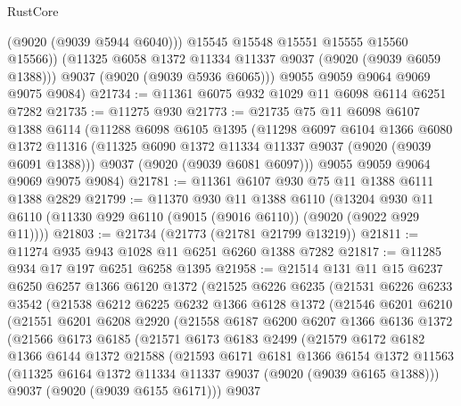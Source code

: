 \begin{lexlean}{RustCore}
\begin{coremodule}
              (@9020 (@9039 @5944 @6040)))
            @15545
            @15548
            @15551
            @15555
            @15560
            @15566))
        (@11325 @6058 @1372 @11334 @11337 @9037 (@9020 (@9039 @6059 @1388)))
        @9037
        (@9020 (@9039 @5936 @6065)))
      @9055
      @9059
      @9064
      @9069
      @9075
      @9084)
@21734 := @11361 @6075 @932 @1029 @11 @6098 @6114 @6251 @7282
@21735 := @11275 @930
@21773 := @21735
    @75
    @11
    @6098
    @6107
    @1388
    @6114
    (@11288
      @6098
      @6105
      @1395
      (@11298
        @6097
        @6104
        @1366
        @6080
        @1372
        @11316
        (@11325 @6090 @1372 @11334 @11337 @9037 (@9020 (@9039 @6091 @1388)))
        @9037
        (@9020 (@9039 @6081 @6097)))
      @9055
      @9059
      @9064
      @9069
      @9075
      @9084)
@21781 := @11361 @6107 @930 @75 @11 @1388 @6111 @1388 @2829
@21799 := @11370
    @930
    @11
    @1388
    @6110
    (@13204 @930 @11 @6110 (@11330 @929 @6110 (@9015 (@9016 @6110)) (@9020 (@9022 @929 @11))))
@21803 := @21734 (@21773 (@21781 @21799 @13219))
@21811 := @11274 @935 @943 @1028 @11 @6251 @6260 @1388 @7282
@21817 := @11285 @934 @17 @197 @6251 @6258 @1395
@21958 := @21514
    @131
    @11
    @15
    @6237
    @6250
    @6257
    @1366
    @6120
    @1372
    (@21525
      @6226
      @6235
      (@21531
        @6226
        @6233
        @3542
        (@21538
          @6212
          @6225
          @6232
          @1366
          @6128
          @1372
          (@21546
            @6201
            @6210
            (@21551
              @6201
              @6208
              @2920
              (@21558
                @6187
                @6200
                @6207
                @1366
                @6136
                @1372
                (@21566
                  @6173
                  @6185
                  (@21571
                    @6173
                    @6183
                    @2499
                    (@21579
                      @6172
                      @6182
                      @1366
                      @6144
                      @1372
                      @21588
                      (@21593
                        @6171
                        @6181
                        @1366
                        @6154
                        @1372
                        @11563
                        (@11325 @6164 @1372 @11334 @11337 @9037 (@9020 (@9039 @6165 @1388)))
                        @9037
                        (@9020 (@9039 @6155 @6171)))
                      @9037

\end{coremodule}
\end{lexlean}
